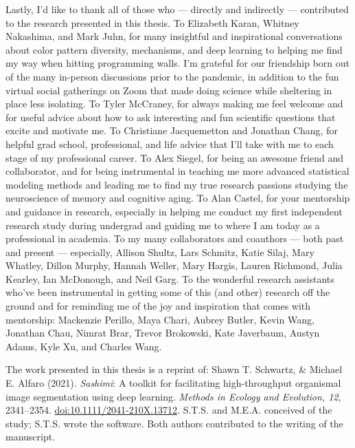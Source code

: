{Lastly, I'd like to thank all of those who --- directly and indirectly --- contributed to the research presented in this thesis. To Elizabeth Karan, Whitney Nakashima, and Mark Juhn, for many insightful and inspirational conversations about color pattern diversity, mechanisms, and deep learning to helping me find my way when hitting programming walls. I'm grateful for our friendship born out of the many in-person discussions prior to the pandemic, in addition to the fun virtual social gatherings on Zoom that made doing science while sheltering in place less isolating. To Tyler McCraney, for always making me feel welcome and for useful advice about how to ask interesting and fun scientific questions that excite and motivate me. To Christiane Jacquemetton and Jonathan Chang, for helpful grad school, professional, and life advice that I'll take with me to each stage of my professional career. To Alex Siegel, for being an awesome friend and collaborator, and for being instrumental in teaching me more advanced statistical modeling methods and leading me to find my true research passions studying the neuroscience of memory and cognitive aging. To Alan Castel, for your mentorship and guidance in research, especially in helping me conduct my first independent research study during undergrad and guiding me to where I am today as a professional in academia. To my many collaborators and coauthors --- both past and present --- especially, Allison Shultz, Lars Schmitz, Katie Silaj, Mary Whatley, Dillon Murphy, Hannah Weller, Mary Hargis, Lauren Richmond, Julia Kearley, Ian McDonough, and Neil Garg. To the wonderful research assistants who've been instrumental in getting some of this (and other) research off the ground and for reminding me of the joy and inspiration that comes with mentorship: Mackenzie Perillo, Maya Chari, Aubrey Butler, Kevin Wang, Jonathan Chau, Nimrat Brar, Trevor Brokowski, Kate Javerbaum, Austyn Adams, Kyle Xu, and Charles Wang.

The work presented in this thesis is a reprint of: Shawn T. Schwartz, \& Michael E. Alfaro (2021). \emph{Sashimi}: A toolkit for facilitating high-throughput organismal image segmentation using deep learning. \textit{Methods in Ecology and Evolution, 12}, 2341–2354. \href{https://doi.org/10.1111/2041-210X.13712}{doi:10.1111/2041-210X.13712}. S.T.S. and M.E.A. conceived of the study; S.T.S. wrote the software. Both authors contributed to the writing of the manuscript.}